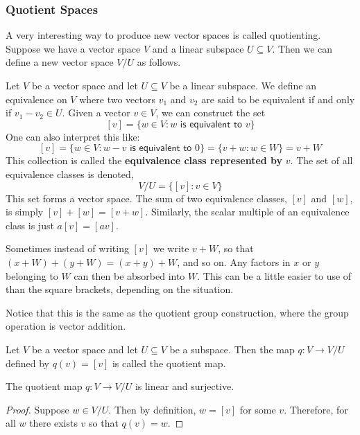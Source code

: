 \subsubsection{Quotient Spaces}
A very interesting way to produce new vector spaces is called quotienting. Suppose we have a vector space $V$ and a linear subspace $U\subseteq V$. Then we can define a new vector space $V/U$ as follows.
\begin{defn}
    Let $V$ be a vector space and let $U \subseteq V$ be a linear subspace. We define an equivalence on $V$ where two vectors $v_1$ and $v_2$ are said to be equivalent if and only if $v_1-v_2\in U$. Given a vector $v \in V$, we can construct the set 
    \[[v] = \{w \in V : w \textsf{ is equivalent to } v\}\]
    One can also interpret this like:
    \[[v] = \{w \in V: w-v \textsf{ is equivalent to } 0\} = \{v + w: w\in W\} = v + W\]
    This collection is called the \textbf{equivalence class represented by } $v$. The set of all equivalence classes is denoted,
    \[ V/U = \{[v] : v \in V\}\]
    This set forms a vector space. The sum of two equivalence classes, $[v]$ and $[w]$, is simply $[v]+[w] = [v+w]$. Similarly, the scalar multiple of an equivalence class is just $a[v] = [av]$.

    Sometimes instead of writing $[v]$ we write $v+W$, so that $(x+W)+(y+W) = (x+y)+W$, and so on. Any factors in $x$ or $y$ belonging to $W$ can then be absorbed into $W$. This can be a little easier to use of than the square brackets, depending on the situation.
\end{defn}
\begin{remark*}
    Notice that this is the same as the quotient group construction, where the group operation is vector addition.
\end{remark*}
\begin{defn}
    Let $V$ be a vector space and let $U \subseteq V$ be a subspace. Then the map $q : V \to V/U$ defined by $q(v) = [v]$ is called the quotient map.
\end{defn}
\begin{thm}
    The quotient map $q : V \to V/U$ is linear and surjective.
\end{thm}
\begin{proof}
    Suppose $w \in V/U$. Then by definition, $w = [v]$ for some $v$. Therefore, for all $w$ there exists $v$ so that $q(v)=w$.
\end{proof}

